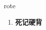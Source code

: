 
\begin{frame}
{\huge rote}
\begin{center}
\begin{enumerate}\Large
  \item \textbf{死记硬背}
\end{enumerate}
\end{center}
\end{frame}
